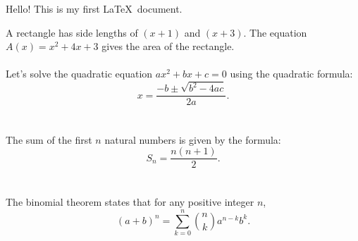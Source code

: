 \documentclass[11pt]{article}
\begin{document}
Hello! This is my first \LaTeX\ document.

A rectangle has side lengths of $(x+1)$ and $(x+3)$. The equation $A(x) = x^2 + 4x + 3$ gives the area of the rectangle.\\\\

Let's solve the quadratic equation $ax^2 + bx + c = 0$ using the quadratic formula: $$x = \frac{-b \pm \sqrt{b^2-4ac}}{2a}.$$ \\\\

The sum of the first $n$ natural numbers is given by the formula: $$S_n = \frac{n(n+1)}{2}.$$ \\\\

The binomial theorem states that for any positive integer $n$, $$ (a + b)^n = \sum_{k=0}^{n} \binom{n}{k} a^{n-k} b^k.$$
\end{document}
